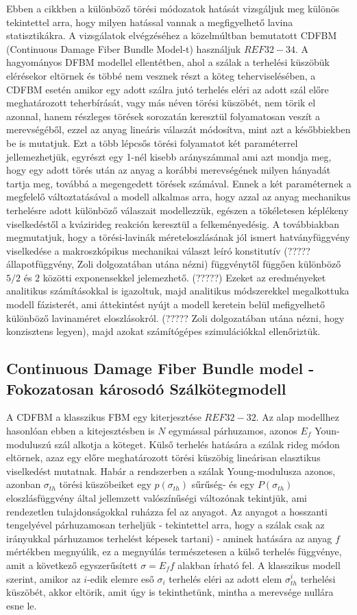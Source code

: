 Ebben a cikkben a különböző törési módozatok hatását vizsgáljuk meg különös tekintettel arra, hogy milyen hatással vannak a megfigyelhető lavina statisztikákra. A vizsgálatok elvégzéséhez a közelmúltban bemutatott CDFBM (Continuous Damage Fiber Bundle Model-t) használjuk $REF32-34$. A hagyományos DFBM modellel ellentétben, ahol a szálak a terhelési küszöbük elérésekor eltörnek és többé nem vesznek részt a köteg teherviselésében, a CDFBM esetén amikor egy adott szálra jutó terhelés eléri az adott szál előre meghatározott teherbírását, vagy más néven törési küszöbét, nem törik el azonnal, hanem részleges törések sorozatán keresztül folyamatosan veszít a merevségéből, ezzel az anyag lineáris válaszát módosítva, mint azt a későbbiekben be is mutatjuk. 
Ezt a több lépcsős törési folyamatot két paraméterrel jellemezhetjük, egyrészt egy 1-nél kisebb arányszámmal ami azt mondja meg, hogy egy adott törés után az anyag a korábbi merevségének milyen hányadát tartja meg, továbbá a megengedett törések számával. Ennek a két paraméternek a megfelelő változtatásával a modell alkalmas arra, hogy azzal az anyag mechanikus terhelésre adott különböző válaszait modellezzük, egészen a tökéletesen képlékeny viselkedéstől a kvázirideg reakción keresztül a felkeményedésig. A továbbiakban megmutatjuk, hogy a törési-lavinák méreteloszlásának jól ismert hatványfüggvény viselkedése a makroszkópikus mechanikai választ leíró konstitutív (????? állapotfüggvény, Zoli dolgozatában utána nézni) függvénytől függően különböző $5/2$ és $2$ közötti exponensekkel jelemezhető. (?????) Ezeket az eredményeket analitikus számításokkal is igazoltuk, majd analitikus módszerekkel megalkottuka modell fázisterét, ami áttekintést nyújt a modell keretein belül mefigyelhető különböző lavinaméret eloszlásokról. (????? Zoli dolgozatában utána nézni, hogy konzisztens legyen), majd azokat számítógépes szimulációkkal ellenőriztük. 

\subsection{Continuous Damage Fiber Bundle model - Fokozatosan károsodó Szálkötegmodell}
A CDFBM a klasszikus FBM egy kiterjesztése $REF32-32$. Az alap modellhez hasonlóan ebben a kitejesztésben is $N$ egymással párhuzamos, azonos $E_f$ Youn-moduluszú szál alkotja a köteget. Külső terhelés hatására a szálak rideg módon eltörnek, azaz egy előre meghatározott törési küszöbig lineárisan elasztikus viselkedést mutatnak. 
Habár a rendszerben a szálak Young-modulusza azonos, azonban $\sigma_{th}$ törési küszöbeiket egy $p(\sigma_{th})$ sűrűség- és egy $P(\sigma_{th})$ eloszlásfüggvény által jellemzett valószínűségi változónak tekintjük, ami rendezetlen tulajdonságokkal ruházza fel az anyagot. 
Az anyagot a hosszanti tengelyével párhuzamosan terheljük - tekintettel arra, hogy a szálak csak az irányukkal párhuzamos terhelést képesek tartani) - aminek hatására az anyag $f$ mértékben megnyúlik, ez a megnyúlás természetesen a külső terhelés függvénye, amit a következő egyszerűsített $\sigma=E_{f}f$ alakban írható fel. A klasszikus modell szerint, amikor az $i$-edik elemre eső $\sigma_{i}$ terhelés eléri az adott elem $\sigma_{th}^{i}$ terhelési küszöbét, akkor eltörik, amit úgy is tekinthetünk, mintha a merevsége nullára esne le.

